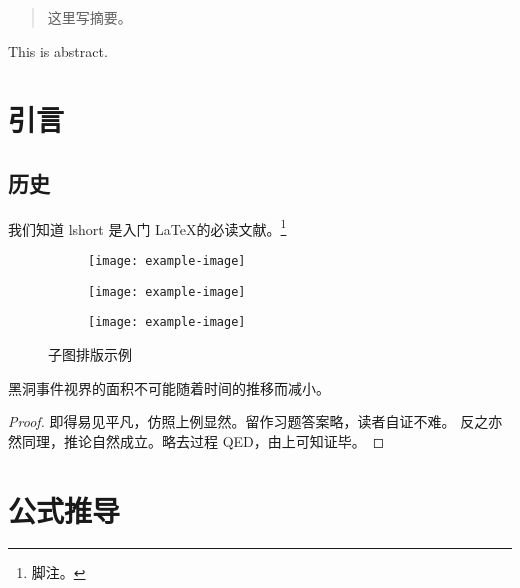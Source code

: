 \documentclass[professional,ncu,newenv]{ncuthesis}
\begin{document}
\maketitle
\frontmatter
\makedecaut
\begin{abstract}
这里写摘要。
\end{abstract}
\begin{abstract*}
This is abstract.
\end{abstract*}
\tableofcontents
\mainmatter
\chapter{引言}
\section{历史}
我们知道 lshort\cite{lshortcn} 是入门 \LaTeX 的必读文献。\footnote{脚注。}
\begin{figure}[htb]
\centering
\begin{subfigure}{.45\textwidth}
\centering
\texttt{[image: example-image]}
\label{fig:subfigexp-a}
\end{subfigure}
\begin{subfigure}{.45\textwidth}
\centering
\texttt{[image: example-image]}
\label{fig:subfigexp-b}
\end{subfigure}
\begin{subfigure}{.45\textwidth}
\centering
\texttt{[image: example-image]}
\label{fig:subfigexp-c}
\end{subfigure}
\caption{子图排版示例}
\label{fig:subfig}
\end{figure}
\begin{law}[黑洞面积定律]
黑洞事件视界的面积不可能随着时间的推移而减小。
\end{law}
\begin{proof}
即得易见平凡，仿照上例显然。留作习题答案略，读者自证不难。
反之亦然同理，推论自然成立。略去过程 QED，由上可知证毕。
\end{proof}
\appendix
\chapter{公式推导}
\end{document}
